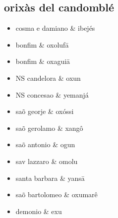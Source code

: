 \documentclass[danish,a4paper,12pt]{article}
\begin{document}
\subsection*{orixàs del candomblé}
\begin{itemize}
  \item[] cosma e damiano \& ibej\'es
  \item[] bonfim \& oxolufā
  \item[] bonfim \& oxaguiā
  \item[] NS candelora \& oxun
  \item[] NS concesao \& yemanjá
  \item[] saõ georje \& oxóssi
  \item[] saõ gerolamo \& xangô
  \item[] saõ antonio \& ogun
  \item[] sav lazzaro \& omolu
  \item[] santa barbara \& yansā
  \item[] saõ bartolomeo \& oxumarê
  \item[] demonio \& exu
\end{itemize}
\end{document}
